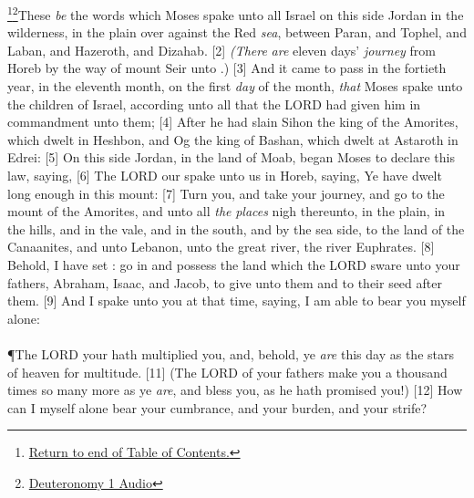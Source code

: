 \footnote{\textcolor[cmyk]{0.99998,1,0,0}{\hyperlink{TOC}{Return to end of Table of Contents.}}}\footnote{\href{https://audiobible.com/bible/deuteronomy_1.html}{\textcolor[cmyk]{0.99998,1,0,0}{Deuteronomy 1 Audio}}}\textcolor[cmyk]{0.99998,1,0,0}{These \emph{be} the words which Moses spake unto all Israel on this side Jordan in the wilderness, in the plain over against the Red \emph{sea}, between Paran, and Tophel, and Laban, and Hazeroth, and Dizahab.}
[2] \textcolor[cmyk]{0.99998,1,0,0}{\emph{(There} \emph{are} eleven days' \emph{journey} from Horeb by the way of mount Seir unto .)}
[3] \textcolor[cmyk]{0.99998,1,0,0}{And it came to pass in the fortieth year, in the eleventh month, on the first \emph{day} of the month, \emph{that} Moses spake unto the children of Israel, according unto all that the LORD had given him in commandment unto them;}
[4] \textcolor[cmyk]{0.99998,1,0,0}{After he had slain Sihon the king of the Amorites, which dwelt in Heshbon, and Og the king of Bashan, which dwelt at Astaroth in Edrei:}
[5] \textcolor[cmyk]{0.99998,1,0,0}{On this side Jordan, in the land of Moab, began Moses to declare this law, saying,}
[6] \textcolor[cmyk]{0.99998,1,0,0}{The LORD our  spake unto us in Horeb, saying, Ye have dwelt long enough in this mount:}
[7] \textcolor[cmyk]{0.99998,1,0,0}{Turn you, and take your journey, and go to the mount of the Amorites, and unto all \emph{the} \emph{places} nigh thereunto, in the plain, in the hills, and in the vale, and in the south, and by the sea side, to the land of the Canaanites, and unto Lebanon, unto the great river, the river Euphrates.}
[8] \textcolor[cmyk]{0.99998,1,0,0}{Behold, I have set : go in and possess the land which the LORD sware unto your fathers, Abraham, Isaac, and Jacob, to give unto them and to their seed after them.}
[9] \textcolor[cmyk]{0.99998,1,0,0}{And I spake unto you at that time, saying, I am  able to bear you myself alone:}\\
\\
\P \textcolor[cmyk]{0.99998,1,0,0}{The LORD your  hath multiplied you, and, behold, ye \emph{are} this day as the stars of heaven for multitude.}
[11] \textcolor[cmyk]{0.99998,1,0,0}{(The LORD  of your fathers make you a thousand times so many more as ye \emph{are}, and bless you, as he hath promised you!)}
[12] \textcolor[cmyk]{0.99998,1,0,0}{How can I myself alone bear your cumbrance, and your burden, and your strife?}
